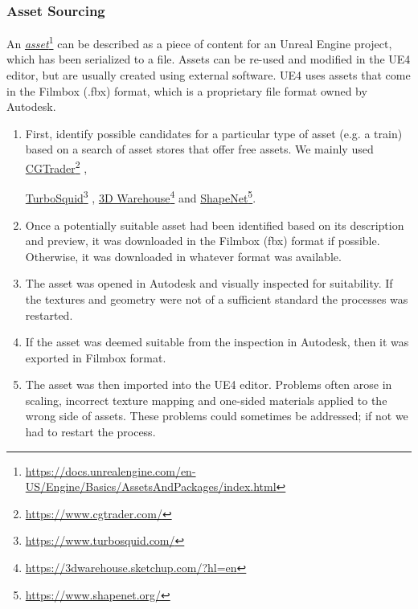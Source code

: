\subsubsection{Asset Sourcing}
%
An \href{https://docs.unrealengine.com/en-US/Engine/Basics/AssetsAndPackages/index.html}{\textit{asset}}\footnote{\href{https://docs.unrealengine.com/en-US/Engine/Basics/AssetsAndPackages/index.html}{https://docs.unrealengine.com/en-US/Engine/Basics/AssetsAndPackages/index.html}} can be described as a piece of content for an Unreal Engine project, which has been serialized to a file. Assets can be re-used and modified in the UE4 editor, but are usually created using external software. UE4 uses assets that come in the Filmbox (.fbx) format, which is a proprietary file format owned by Autodesk.
\begin{enumerate}
    \item First, identify possible candidates for a particular type of asset (e.g. a train) based on a search of asset stores that offer free assets. We mainly used \href{https://www.cgtrader.com/}{CGTrader}\footnote{\href {https://www.cgtrader.com/}{https://www.cgtrader.com/}} ,
    
    \href{https://www.turbosquid.com/}{TurboSquid}\footnote{\href {https://www.turbosquid.com/}{https://www.turbosquid.com/}}
    , 
    \href{https://3dwarehouse.sketchup.com/?hl=en}{3D Warehouse}\footnote{\href {https://3dwarehouse.sketchup.com/?hl=en}{https://3dwarehouse.sketchup.com/?hl=en}} 
    and
    \href{https://www.shapenet.org/}{ShapeNet}\footnote{\href {https://www.shapenet.org/}{https://www.shapenet.org/}}.
    
    \item Once a potentially suitable asset had been identified based on its description and preview, it was downloaded in the Filmbox (fbx) format if possible. Otherwise, it was downloaded in whatever format was available. 
    \item The asset was opened in Autodesk  and visually inspected for suitability. If the textures and geometry were not of a sufficient standard the processes was restarted.
    \item If the asset was deemed suitable from the inspection in Autodesk, then it was exported in Filmbox format.
    \item The asset was then imported into the UE4 editor. Problems often arose in scaling, incorrect texture mapping and one-sided materials applied to the wrong side of assets. These problems could sometimes be addressed; if not we had to restart the process.
\end{enumerate}

